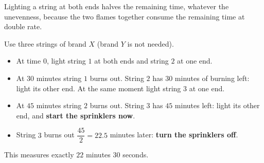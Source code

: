 Lighting a string at both ends halves the remaining time, whatever the unevenness, because the two flames together consume the remaining time at double rate.

Use three strings of brand $X$ (brand $Y$ is not needed).
\begin{itemize}
\item At time $0$, light string $1$ at both ends and string $2$ at one end.
\item At $30$ minutes string $1$ burns out. String $2$ has $30$ minutes of burning left: light its other end. At the same moment light string $3$ at one end.
\item At $45$ minutes string $2$ burns out. String $3$ has $45$ minutes left: light its other end, and \textbf{start the sprinklers now}.
\item String $3$ burns out $\dfrac{45}{2}=22.5$ minutes later: \textbf{turn the sprinklers off}.
\end{itemize}
This measures exactly $22$ minutes $30$ seconds.
